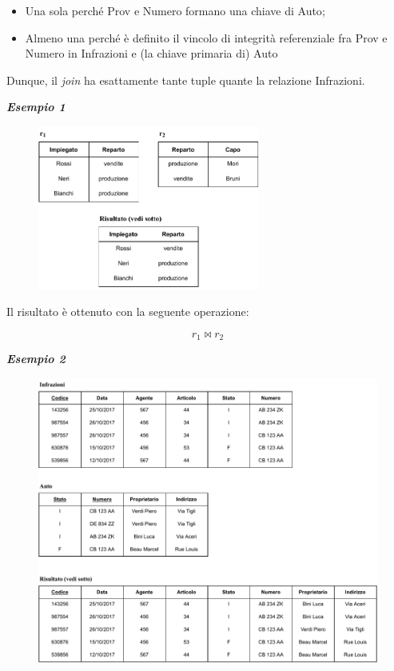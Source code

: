 \documentclass[a4paper]{article}
\begin{document}
	\begin{itemize}
		\item  Una sola perché \textsf{Prov} e \textsf{Numero} formano una chiave di \textsf{Auto};
		\item Almeno una perché è definito il vincolo di integrità referenziale fra \textsf{Prov} e \textsf{Numero} in \textsf{Infrazioni} e (la chiave primaria di) \textsf{Auto}
	\end{itemize}

	\noindent
	Dunque, il \emph{join} ha esattamente tante tuple quante la relazione \textsf{Infrazioni}.
	
	\newpage
	
	\noindent
	\textcolor{Green4}{\textbf{\emph{Esempio 1}}}
	
	\begin{figure}[!htp]
		\centering
		\includegraphics[width=0.65\textwidth]{img/join_naturale1.pdf}
	\end{figure}
	
	\noindent
	Il risultato è ottenuto con la seguente operazione:
	
	\begin{equation*}
		r_{1} \Join r_{2}
	\end{equation*}

	\noindent
	\textcolor{Green4}{\textbf{\emph{Esempio 2}}}
	
	\begin{figure}[!htp]
		\centering
		\includegraphics[width=\textwidth]{img/join_naturale2.pdf}
	\end{figure}
	
\end{document}
